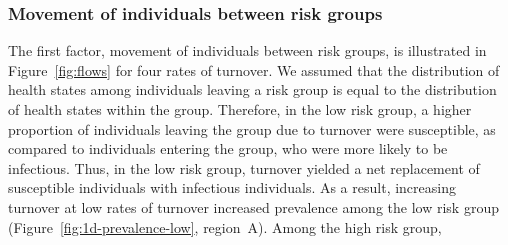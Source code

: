 \subsubsection{Movement of individuals between risk groups}		%
The first factor, movement of individuals between risk groups,
is illustrated in Figure~\ref{fig:flows} for four rates of turnover.		%
We assumed that the distribution of health states among individuals leaving a risk group
is equal to the distribution of health states within the group.		%
Therefore, in the low risk group,
a higher proportion of individuals leaving the group due to turnover were susceptible,	%
as compared to individuals entering the group, who were more likely to be infectious.	%
Thus, in the low risk group,
turnover yielded a net replacement of susceptible individuals with infectious individuals.
As a result, increasing turnover at low rates of turnover
increased prevalence among the low risk group
(Figure~\ref{fig:1d-prevalence-low}, region~A).
Among the high risk group,
